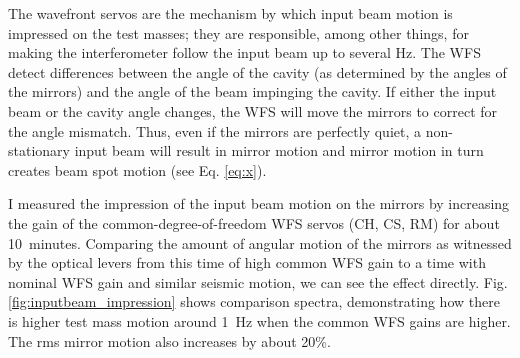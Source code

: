 
The wavefront servos are the mechanism by which input beam motion is
impressed on the test masses; they are responsible, among other
things, for making the interferometer follow the input beam up to
several Hz. The WFS detect differences between the angle of the cavity
(as determined by the angles of the mirrors) and the angle of the beam
impinging the cavity. If either the input beam or the cavity angle
changes, the WFS will move the mirrors to correct for the angle
mismatch. Thus, even if the mirrors are perfectly quiet, a
non-stationary input beam will result in mirror motion and mirror
motion in turn creates beam spot motion (see Eq. \ref{eq:x}).

I measured the impression of the input beam motion on the mirrors by
increasing the gain of the common-degree-of-freedom WFS servos (CH,
CS, RM) for about 10~minutes. Comparing the amount of angular motion
of the mirrors as witnessed by the optical levers from this time of
high common WFS gain to a time with nominal WFS gain and similar
seismic motion, we can see the effect
directly. Fig. \ref{fig:inputbeam_impression} shows comparison
spectra, demonstrating how there is higher test mass motion around
1~Hz when the common WFS gains are higher. The rms mirror motion also
increases by about 20\%.

